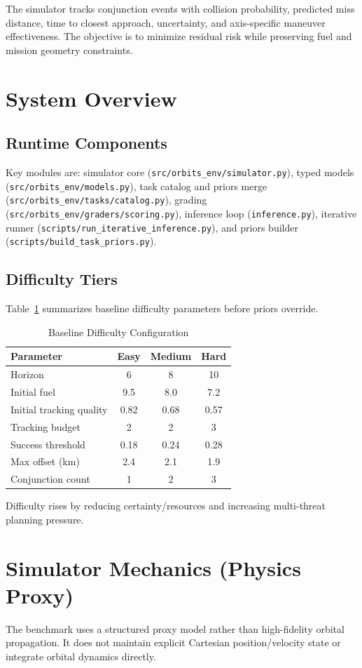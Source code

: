 \documentclass[conference]{IEEEtran}
\begin{document}
The simulator tracks conjunction events with collision probability, predicted miss distance, time to closest approach, uncertainty, and axis-specific maneuver effectiveness. The objective is to minimize residual risk while preserving fuel and mission geometry constraints.

\section{System Overview}
\subsection{Runtime Components}
Key modules are: simulator core (\texttt{src/orbits\_env/simulator.py}), typed models (\texttt{src/orbits\_env/models.py}), task catalog and priors merge (\texttt{src/orbits\_env/tasks/catalog.py}), grading (\texttt{src/orbits\_env/graders/scoring.py}), inference loop (\texttt{inference.py}), iterative runner (\texttt{scripts/run\_iterative\_inference.py}), and priors builder (\texttt{scripts/build\_task\_priors.py}).

\subsection{Difficulty Tiers}
Table~\ref{tab:difficulty} summarizes baseline difficulty parameters before priors override.

\begin{table}[htbp]
\caption{Baseline Difficulty Configuration}
\label{tab:difficulty}
\centering
\begin{tabular}{lccc}
\toprule
Parameter & Easy & Medium & Hard \\
\midrule
Horizon & 6 & 8 & 10 \\
Initial fuel & 9.5 & 8.0 & 7.2 \\
Initial tracking quality & 0.82 & 0.68 & 0.57 \\
Tracking budget & 2 & 2 & 3 \\
Success threshold & 0.18 & 0.24 & 0.28 \\
Max offset (km) & 2.4 & 2.1 & 1.9 \\
Conjunction count & 1 & 2 & 3 \\
\bottomrule
\end{tabular}
\end{table}

Difficulty rises by reducing certainty/resources and increasing multi-threat planning pressure.

\section{Simulator Mechanics (Physics Proxy)}
The benchmark uses a structured proxy model rather than high-fidelity orbital propagation. It does not maintain explicit Cartesian position/velocity state or integrate orbital dynamics directly.
\end{document}
